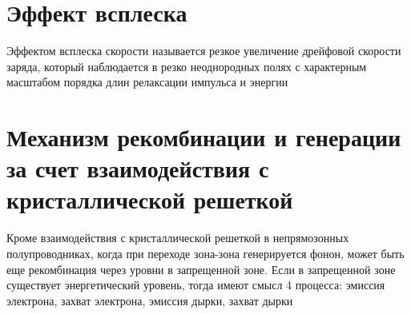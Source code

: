 \begin{multicols*}{2}
		\section{Эффект всплеска}
		Эффектом всплеска скорости называется резкое увеличение дрейфовой скорости заряда, который наблюдается в резко неоднородных полях с характерным масштабом порядка длин релаксации импульса и энергии

		\section{Механизм рекомбинации и генерации за счет взаимодействия с кристаллической решеткой}
		Кроме взаимодействия с кристаллической решеткой в непрямозонных полупроводниках, когда при переходе зона-зона генерируется фонон, может быть еще рекомбинация через уровни в запрещенной зоне. Если в запрещенной зоне существует энергетический уровень, тогда имеют смысл 4 процесса: эмиссия электрона, захват электрона, эмиссия дырки, захват дырки

	\end{multicols*}

